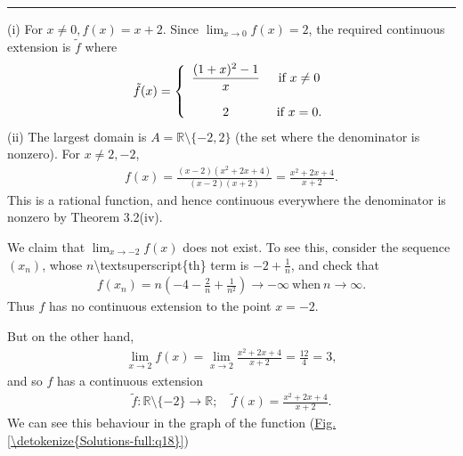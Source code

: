 \documentclass[letterpaper,10pt,english]{jupyterBook}
\begin{document}
\bigskip\hrule\bigskip


\sphinxAtStartPar
{\hyperref[\detokenize{Problems:id18}]{}}

\sphinxAtStartPar
(i) For \(x \neq 0, f(x) = x+2\). Since \(\lim_{x \rightarrow 0}f(x) = 2\), the required continuous extension is \(\tilde{f}\) where
\begin{equation*}
\begin{split}
\tilde{f}(x) = \left\{\begin{array}{c c} \displaystyle\frac{(1 + x)^{2} - 1}{x} & ~\mbox{if}~x \neq 0\\ 
& \\
2 & ~\mbox{if}~x = 0. \end{array} \right.
\end{split}
\end{equation*}
\sphinxAtStartPar
(ii) The largest domain is \(A=\mathbb{R} \setminus \{-2, 2\}\) (the set where the denominator is non\sphinxhyphen{}zero). For \(x \neq 2, -2\),
\begin{equation*}
\begin{split}
f(x) = \frac{(x-2)(x^{2} + 2x + 4)}{(x-2)(x+2)}=\frac{x^{2} + 2x + 4}{x + 2}.
\end{split}
\end{equation*}
\sphinxAtStartPar
This is a rational function, and hence continuous everywhere the denominator is non\sphinxhyphen{}zero by Theorem 3.2(iv).

We claim that \(\lim_{x \rightarrow -2}f(x)\) does not exist. To see this, consider the sequence \((x_{n})\), whose \(n\)\textbackslash{}textsuperscript\{th\} term is \(-2 + \frac{1}{n}\), and check that
\begin{equation*}
\begin{split}
f(x_{n}) = n\left(-4 -\frac{2}{n} + \frac{1}{n^2}\right) \rightarrow -\infty~\mbox{when}~n \rightarrow \infty.
\end{split}
\end{equation*}
\sphinxAtStartPar
Thus \(f\) has no continuous extension to the point \(x =-2\).

But on the other hand,
\begin{equation*}
\begin{split}
\lim_{x \rightarrow 2}f(x) = \lim_{x\rightarrow 2}  \frac{x^{2} + 2x + 4}{x + 2} = \frac{12}{4} = 3,
\end{split}
\end{equation*}
\sphinxAtStartPar
and so \(f\) has a continuous extension
\begin{equation*}
\begin{split}
\tilde{f}:\mathbb{R} \setminus \{-2\}\to\mathbb{R}; \hspace{1em} \tilde{f}(x) = \frac{x^2+2x+4}{x+2}.
\end{split}
\end{equation*}
\sphinxAtStartPar
We can see this behaviour in the graph of the function (\hyperref[\detokenize{Solutions-full:q18}]{Fig.\@ \ref{\detokenize{Solutions-full:q18}}})
\end{document}
